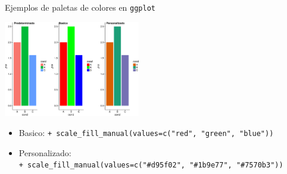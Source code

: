\documentclass[ignorenonframetext,]{beamer}
\providecommand{\tightlist}{%
  \setlength{\itemsep}{0pt}\setlength{\parskip}{0pt}}
\begin{document}
\begin{frame}[fragile]{Ejemplos de paletas de colores en
\texttt{ggplot}}

\includegraphics[width=225px]{../figures/10_talk/ejemplo-1}

\begin{itemize}[<+->]
\tightlist
\item
  Basico:
  \texttt{+\ scale\_fill\_manual(values=c("red",\ "green",\ "blue"))}
\item
  Personalizado:
  \texttt{+\ scale\_fill\_manual(values=c("\#d95f02",\ "\#1b9e77",\ "\#7570b3"))}
\end{itemize}

\end{frame}

\end{document}
